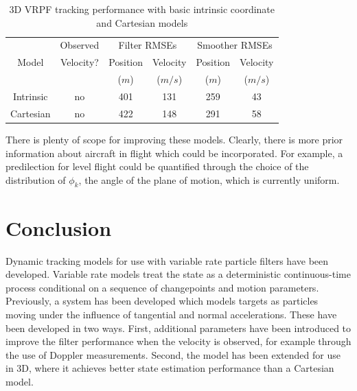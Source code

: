 \documentclass[conference]{IEEEtran}
\begin{document}
\begin{table}
\renewcommand{\arraystretch}{1.3}
\caption{3D VRPF tracking performance with basic intrinsic coordinate and Cartesian models}
\label{tab:3D_performance}
\centering
\begin{tabular}{|c|c|c|c|c|c|}
\hline
      & Observed  & \multicolumn{2}{c|}{Filter RMSEs}  & \multicolumn{2}{c|}{Smoother RMSEs}  \\
Model & Velocity? & Position & Velocity                & Position & Velocity                  \\
      &           & ($m$)    & ($m/s$)                 & ($m$)    & ($m/s$)                   \\
\hline
Intrinsic & no  & 401 & 131 & 259 & 43 \\
\hline
Cartesian & no  & 422 & 148 & 291 & 58 \\
\hline
\end{tabular}
\end{table}
%
There is plenty of scope for improving these models. Clearly, there is more prior information about aircraft in flight which could be incorporated. For example, a predilection for level flight could be quantified through the choice of the distribution of $\phi_k$, the angle of the plane of motion, which is currently uniform.



\section{Conclusion}

Dynamic tracking models for use with variable rate particle filters have been developed. Variable rate models treat the state as a deterministic continuous-time process conditional on a sequence of changepoints and motion parameters. Previously, a system has been developed which models targets as particles moving under the influence of tangential and normal accelerations. These have been developed in two ways. First, additional parameters have been introduced to improve the filter performance when the velocity is observed, for example through the use of Doppler measurements. Second, the model has been extended for use in 3D, where it achieves better state estimation performance than a Cartesian model.





\end{document}
